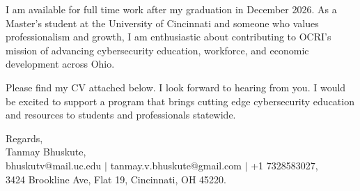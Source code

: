 \documentclass[11pt]{letter}
\begin{document}
\begin{letter}{}
I am available for full time work after my graduation in December 2026. As a Master's student at the University of Cincinnati and someone who values professionalism and growth, I am enthusiastic about contributing to OCRI's mission of advancing cybersecurity education, workforce, and economic development across Ohio.

Please find my CV attached below. I look forward to hearing from you. I would be excited to support a program that brings cutting edge cybersecurity education and resources to students and professionals statewide.

{\setlength{\parskip}{0pt}
Regards,\\
Tanmay Bhuskute,\\
bhuskutv@mail.uc.edu $\mid$ tanmay.v.bhuskute@gmail.com $\mid$ +1 7328583027,\\
3424 Brookline Ave, Flat 19, Cincinnati, OH 45220.
}

\end{letter}
\end{document}
